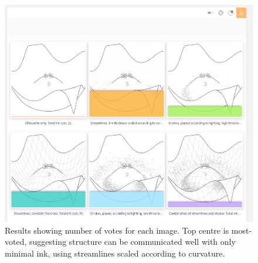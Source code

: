 \begin{figure}[h!]
	\centering
	\includegraphics[width=\textwidth]{images/eval_ink.png}
	\caption{Results showing number of votes for each image. Top centre is most-voted, suggesting structure can be communicated well with only minimal ink, using streamlines scaled according to curvature.}\label{eval_ink}
\end{figure}